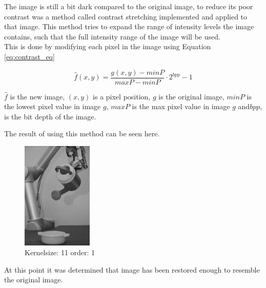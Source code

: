 The image is still a bit dark compared to the original image, to reduce its poor contrast was a method called contrast stretching implemented and applied to that image.  This method tries to expand the range of intensity levels the image contains, such that the full intensity range of the image will be used. 
\\


This is done by modifying each pixel in the image using Equation \ref{eq:contrast_eq}

\begin{equation}
\hat{f}(x,y) = \frac{g(x,y) - minP}{maxP - minP} \cdot 2^{bpp }-1
\label{eq:contrast_eq}
\end{equation}
  
$\hat{f}$ is the new image,  $(x,y)$ is  a pixel position, $g$ is the original image, $minP$ is the lowest pixel value in image $g$, $maxP$ is the max pixel value in image $g$ and$ bpp$, is the bit depth of the image. 

The result of using this method can be seen here. 

\begin{figure}[H]
\centering
 \includegraphics[width=0.30\textwidth]{img1/img_1_gaus_5_1_constrast_strech.png}
        \caption{Kernelsize: 11 order: 1}
         \label{fig:img1_contra11_1}
\end{figure}

At this point it was determined that image has been restored enough to resemble the original image. 

